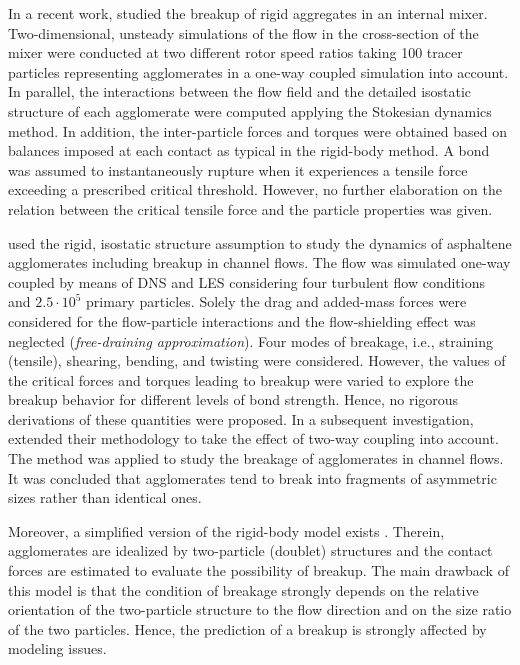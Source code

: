 In a recent work, \citet{frungieri2020cfd} studied the breakup of
rigid aggregates in an internal mixer. Two-dimensional, unsteady
simulations of the flow in the cross-section of the mixer were
conducted at two different rotor speed ratios taking 100 tracer
particles representing agglomerates in a one-way coupled simulation
into account. In parallel, the interactions between the flow field and
the detailed isostatic structure of each agglomerate were computed
applying the Stokesian dynamics method. In addition, the
inter-particle forces and torques were obtained based on balances
imposed at each contact as typical in the rigid-body method. A bond
was assumed to instantaneously rupture when it experiences a tensile
force exceeding a prescribed critical threshold. However, no further
elaboration on the relation between the critical tensile force and the
particle properties was given. 

\citet{schutte2015hydrodynamic} used the rigid, isostatic structure
assumption to study the dynamics of asphaltene agglomerates including
breakup in channel flows. The flow was simulated one-way coupled by
means of DNS and LES considering four turbulent flow conditions and
$2.5 \cdot 10^{5}$ primary particles. Solely the drag and added-mass
forces were considered for the flow-particle interactions and the
flow-shielding effect was neglected (\emph{free-draining
approximation}). Four modes of breakage, i.e., straining (tensile),
shearing, bending, and twisting were considered. However, the values
of the critical forces and torques leading to breakup were varied to
explore the breakup behavior for different levels of bond
strength. Hence, no rigorous derivations of these quantities were
proposed. In a subsequent investigation, \citet{schutte2018formation}
extended their methodology to take the effect of two-way coupling into
account.  The method was applied to study the breakage of agglomerates
in channel flows. It was concluded that agglomerates tend to break
into fragments of asymmetric sizes rather than identical
ones.

Moreover, a simplified version of the rigid-body model exists
\citep{kousaka1979dispersion,kousaka1980re,kousaka1992dispersion,
  niedballa2000modeling}. Therein, agglomerates are idealized by
two-particle (doublet) structures and the contact forces are estimated
to evaluate the possibility of breakup. The main drawback of this
model is that the condition of breakage strongly depends on the
relative orientation of the two-particle structure to the flow
direction and on the size ratio of the two particles. Hence, the
prediction of a breakup is strongly affected by modeling issues.
\newline

